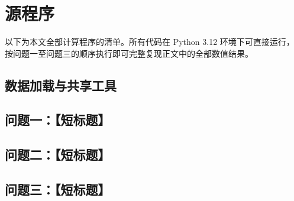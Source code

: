 
\section{源程序}

以下为本文全部计算程序的清单。所有代码在 Python 3.12 环境下可直接运行，
按问题一至问题三的顺序执行即可完整复现正文中的全部数值结果。

\renewcommand{\thesubsection}{A\thinskip.\thinskip\arabic{subsection}}


\subsection{数据加载与共享工具}


\subsection{问题一：【短标题】}


\subsection{问题二：【短标题】}


\subsection{问题三：【短标题】}

